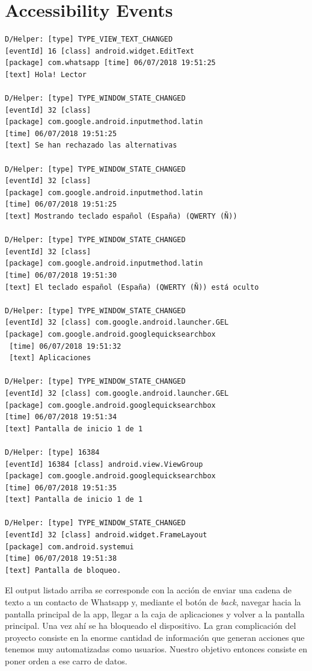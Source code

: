\documentclass[12pt,a4paper,oneside]{book} %
\begin{document}
\section{Accessibility Events}
\begin{verbatim}
D/Helper: [type] TYPE_VIEW_TEXT_CHANGED 
[eventId] 16 [class] android.widget.EditText 
[package] com.whatsapp [time] 06/07/2018 19:51:25 
[text] Hola! Lector

D/Helper: [type] TYPE_WINDOW_STATE_CHANGED 
[eventId] 32 [class]  
[package] com.google.android.inputmethod.latin 
[time] 06/07/2018 19:51:25 
[text] Se han rechazado las alternativas

D/Helper: [type] TYPE_WINDOW_STATE_CHANGED 
[eventId] 32 [class]  
[package] com.google.android.inputmethod.latin 
[time] 06/07/2018 19:51:25 
[text] Mostrando teclado español (España) (QWERTY (Ñ))

D/Helper: [type] TYPE_WINDOW_STATE_CHANGED 
[eventId] 32 [class]
[package] com.google.android.inputmethod.latin 
[time] 06/07/2018 19:51:30 
[text] El teclado español (España) (QWERTY (Ñ)) está oculto

D/Helper: [type] TYPE_WINDOW_STATE_CHANGED 
[eventId] 32 [class] com.google.android.launcher.GEL 
[package] com.google.android.googlequicksearchbox 
 [time] 06/07/2018 19:51:32 
 [text] Aplicaciones
 
D/Helper: [type] TYPE_WINDOW_STATE_CHANGED 
[eventId] 32 [class] com.google.android.launcher.GEL 
[package] com.google.android.googlequicksearchbox 
[time] 06/07/2018 19:51:34 
[text] Pantalla de inicio 1 de 1

D/Helper: [type] 16384 
[eventId] 16384 [class] android.view.ViewGroup 
[package] com.google.android.googlequicksearchbox 
[time] 06/07/2018 19:51:35
[text] Pantalla de inicio 1 de 1

D/Helper: [type] TYPE_WINDOW_STATE_CHANGED 
[eventId] 32 [class] android.widget.FrameLayout 
[package] com.android.systemui 
[time] 06/07/2018 19:51:38 
[text] Pantalla de bloqueo.
\end{verbatim}
El output listado arriba se corresponde con la acción de enviar una cadena de texto a un contacto de Whatsapp y, mediante el botón de \textit{back}, navegar hacia la pantalla principal de la app, llegar a la caja de aplicaciones y volver a la pantalla principal. Una vez ahí se ha bloqueado el dispositivo. 
\newline \newline 
La gran complicación del proyecto consiste en la enorme cantidad de información que generan acciones que tenemos muy automatizadas como usuarios. Nuestro objetivo entonces consiste en poner orden a ese carro de datos. 
\end{document}
